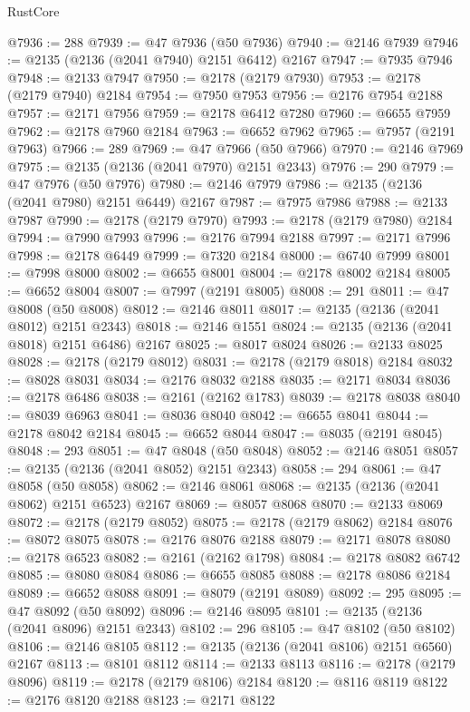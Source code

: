 \begin{lexlean}{RustCore}
\begin{coremodule}
@7936 := 288
@7939 := @47 @7936 (@50 @7936)
@7940 := @2146 @7939
@7946 := @2135 (@2136 (@2041 @7940) @2151 @6412) @2167
@7947 := @7935 @7946
@7948 := @2133 @7947
@7950 := @2178 (@2179 @7930)
@7953 := @2178 (@2179 @7940) @2184
@7954 := @7950 @7953
@7956 := @2176 @7954 @2188
@7957 := @2171 @7956
@7959 := @2178 @6412 @7280
@7960 := @6655 @7959
@7962 := @2178 @7960 @2184
@7963 := @6652 @7962
@7965 := @7957 (@2191 @7963)
@7966 := 289
@7969 := @47 @7966 (@50 @7966)
@7970 := @2146 @7969
@7975 := @2135 (@2136 (@2041 @7970) @2151 @2343)
@7976 := 290
@7979 := @47 @7976 (@50 @7976)
@7980 := @2146 @7979
@7986 := @2135 (@2136 (@2041 @7980) @2151 @6449) @2167
@7987 := @7975 @7986
@7988 := @2133 @7987
@7990 := @2178 (@2179 @7970)
@7993 := @2178 (@2179 @7980) @2184
@7994 := @7990 @7993
@7996 := @2176 @7994 @2188
@7997 := @2171 @7996
@7998 := @2178 @6449
@7999 := @7320 @2184
@8000 := @6740 @7999
@8001 := @7998 @8000
@8002 := @6655 @8001
@8004 := @2178 @8002 @2184
@8005 := @6652 @8004
@8007 := @7997 (@2191 @8005)
@8008 := 291
@8011 := @47 @8008 (@50 @8008)
@8012 := @2146 @8011
@8017 := @2135 (@2136 (@2041 @8012) @2151 @2343)
@8018 := @2146 @1551
@8024 := @2135 (@2136 (@2041 @8018) @2151 @6486) @2167
@8025 := @8017 @8024
@8026 := @2133 @8025
@8028 := @2178 (@2179 @8012)
@8031 := @2178 (@2179 @8018) @2184
@8032 := @8028 @8031
@8034 := @2176 @8032 @2188
@8035 := @2171 @8034
@8036 := @2178 @6486
@8038 := @2161 (@2162 @1783)
@8039 := @2178 @8038
@8040 := @8039 @6963
@8041 := @8036 @8040
@8042 := @6655 @8041
@8044 := @2178 @8042 @2184
@8045 := @6652 @8044
@8047 := @8035 (@2191 @8045)
@8048 := 293
@8051 := @47 @8048 (@50 @8048)
@8052 := @2146 @8051
@8057 := @2135 (@2136 (@2041 @8052) @2151 @2343)
@8058 := 294
@8061 := @47 @8058 (@50 @8058)
@8062 := @2146 @8061
@8068 := @2135 (@2136 (@2041 @8062) @2151 @6523) @2167
@8069 := @8057 @8068
@8070 := @2133 @8069
@8072 := @2178 (@2179 @8052)
@8075 := @2178 (@2179 @8062) @2184
@8076 := @8072 @8075
@8078 := @2176 @8076 @2188
@8079 := @2171 @8078
@8080 := @2178 @6523
@8082 := @2161 (@2162 @1798)
@8084 := @2178 @8082 @6742
@8085 := @8080 @8084
@8086 := @6655 @8085
@8088 := @2178 @8086 @2184
@8089 := @6652 @8088
@8091 := @8079 (@2191 @8089)
@8092 := 295
@8095 := @47 @8092 (@50 @8092)
@8096 := @2146 @8095
@8101 := @2135 (@2136 (@2041 @8096) @2151 @2343)
@8102 := 296
@8105 := @47 @8102 (@50 @8102)
@8106 := @2146 @8105
@8112 := @2135 (@2136 (@2041 @8106) @2151 @6560) @2167
@8113 := @8101 @8112
@8114 := @2133 @8113
@8116 := @2178 (@2179 @8096)
@8119 := @2178 (@2179 @8106) @2184
@8120 := @8116 @8119
@8122 := @2176 @8120 @2188
@8123 := @2171 @8122

\end{coremodule}
\end{lexlean}

